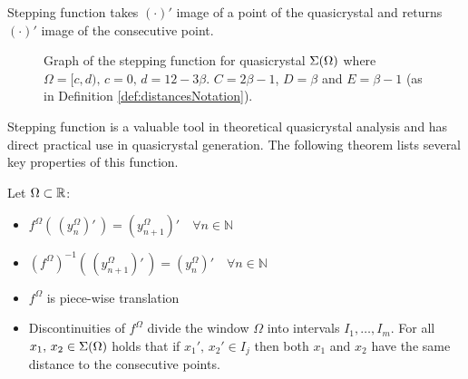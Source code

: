 \documentclass[text.tex]{subfiles}
\begin{document}
\begin{remark}
Stepping function takes $(\cdot)'$ image of a point of the quasicrystal and returns $(\cdot)'$ image of the consecutive point.\\
\end{remark}

\begin{figure}
\centering
{}
\caption{Graph of the stepping function for quasicrystal $\Sigma(\Omega)$ where $\Omega = [c,d),\, c=0,\, d=12-3\beta$. $C= 2\beta-1$, $D= \beta$ and $E= \beta-1$ (as in Definition \ref{def:distancesNotation}).}
\end{figure}

Stepping function is a valuable tool in theoretical quasicrystal analysis and has direct practical use in quasicrystal generation. The following theorem lists several key properties of this function.

\begin{theorem}
\label{def:stepingFunc}
Let $\Omega \subset \mathbb{R}$:
\begin{itemize}
\item $f^\Omega(\,(y_n^\Omega)'\,) = (y_{n+1}^\Omega)' \quad \forall n\in\mathbb{N}$
\item $\left({f^\Omega}\right)^{-1}(\,(y_{n+1}^\Omega)'\,) = (y_{n}^\Omega)' \quad \forall n\in\mathbb{N}$
\item $f^\Omega$ is piece-wise translation 
\item Discontinuities  of $f^\Omega$ divide the window $\Omega$ into intervals $I_1,\dots,I_m$. For all $x_1,\,x_2\in\Sigma(\Omega)$ holds that if $x_1',\,x_2'\in I_j$ then both $x_1$ and $x_2$ have the same distance to the consecutive points. 
\end{itemize}
\end{theorem}
\end{document}
